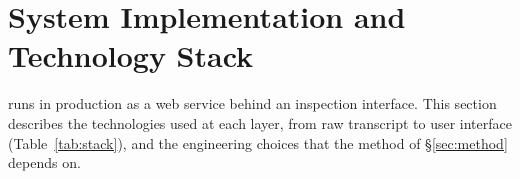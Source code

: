 
\section{System Implementation and Technology Stack}
\label{sec:system}

\method{} runs in production as a web service behind an inspection interface.
This section describes the technologies used at each layer, from raw transcript to user interface (Table~\ref{tab:stack}), and the engineering choices that the method of \S\ref{sec:method} depends on.

